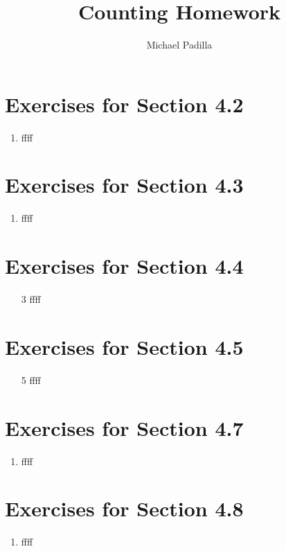 \documentclass[12pt]{article}
\title{Counting Homework}
\author{Michael Padilla}
\begin{document}
 
\maketitle
\section*{Exercises for Section 4.2}
\begin{enumerate}
    \item ffff
\end{enumerate}
\section*{Exercises for Section 4.3}
\begin{enumerate}
    \item ffff
\end{enumerate}
\section*{Exercises for Section 4.4}
\begin{enumerate}
    \item [3] ffff
\end{enumerate}
\section*{Exercises for Section 4.5}
\begin{enumerate}
    \item [5] ffff
\end{enumerate}
\section*{Exercises for Section 4.7}
\begin{enumerate}
    \item ffff
\end{enumerate}
\section*{Exercises for Section 4.8}
\begin{enumerate}
    \item ffff
\end{enumerate}
\end{document}
